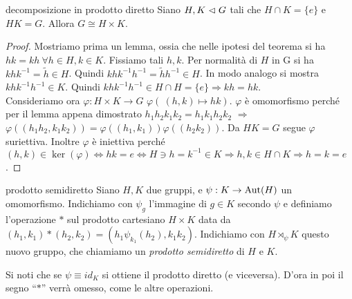 \begin{theorem}{decomposizione in prodotto diretto}
    Siano $H,K \vartriangleleft G$ tali che $H \cap K = \{e\}$ e $HK = G$. Allora $G \cong H \times K$.
\end{theorem}
\begin{proof}
    Mostriamo prima un lemma, ossia che nelle ipotesi del teorema si ha $hk = kh \ \forall h\in H, k \in K$. Fissiamo tali $h,k$. Per normalità di $H$ in G si ha $khk^{-1} = \tilde h \in H$. Quindi $khk^{-1}h^{-1} = \tilde h h^{-1} \in H$. In modo analogo si mostra  $khk^{-1}h^{-1} \in K$. Quindi $khk^{-1}h^{-1} \in H \cap H = \{ e\} \Rightarrow kh= hk$. \\Consideriamo ora $\varphi: H \times K \to G$ $\varphi(\ (h,k) \mapsto hk)$. $\varphi$ è omomorfismo perché per il lemma appena dimostrato $h_1h_2k_1k_2 =  h_1k_1h_2k_2$ $\Rightarrow$ $\varphi((h_1h_2, k_1k_2)) =\varphi((h_1, k_1)) \varphi((h_2k_2))$.  Da $HK = G$ segue $\varphi$ suriettiva. Inoltre $\varphi$ è iniettiva perché $(h,k) \in \ker(\varphi) \iff hk = e \iff H \ni h = k^{-1} \in K \Rightarrow h,k \in H\cap K \Rightarrow h=k=e$.
\end{proof}
\begin{definition}{prodotto semidiretto}
    Siano $H, K$ due gruppi, e $\psi: K \rightarrow \text{Aut}(H)$ un omomorfismo. Indichiamo con $\psi_g$ l'immagine di $g\in K$ secondo $\psi$ e definiamo l'operazione $*$ sul prodotto cartesiano $H \times K$ data da $(h_1,k_1)*(h_2,k_2) = (h_1\psi_{k_1}(h_2), k_1k_2)$. Indichiamo con $H \rtimes_{\psi} K$ questo nuovo gruppo, che chiamiamo un \textit{prodotto semidiretto} di $H$ e $K$.
\end{definition}

Si noti che se $\psi \equiv id_{K}$ si ottiene il prodotto diretto (e viceversa). D'ora in poi il segno ``$*$'' verrà omesso, come le altre operazioni.

